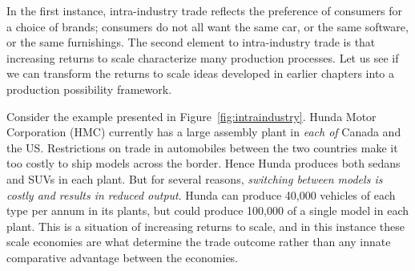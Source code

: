 In the first instance, intra-industry trade reflects the preference of consumers for a choice of brands; consumers do not all want the same car, or the same software, or the same furnishings. The second element to intra-industry trade is that increasing returns to scale characterize many production processes. Let us see if we can transform the returns to scale ideas developed in earlier chapters into a production possibility framework.

Consider the example presented in Figure~\ref{fig:intraindustry}. Hunda Motor Corporation (HMC) currently has a large assembly plant in \textit{each of} Canada and the US. Restrictions on trade in automobiles between the two countries make it too costly to ship models across the border. Hence Hunda produces both sedans and SUVs in each plant. But for several reasons, \textit{switching between models is costly and results in reduced output}. Hunda can produce 40,000 vehicles of each type per annum in its plants, but could produce 100,000 of a single model in each plant. This is a situation of increasing returns to scale, and in this instance these scale economies are what determine the trade outcome rather than any innate comparative advantage between the economies.

